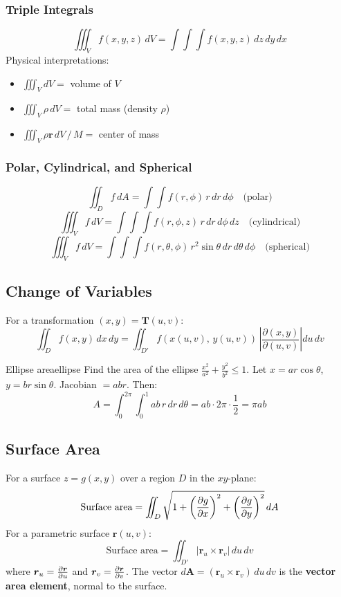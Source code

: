 \documentclass[11pt, letterpaper]{article}
\theoremstyle{plain}
\newcommand{\vv}[1]{\bm{#1}}
\begin{document}
\subsubsection*{Triple Integrals}
\[
    \iiint_V f(x,y,z)\,dV = \int\int\int f(x,y,z)\,dz\,dy\,dx
\]
Physical interpretations:
\begin{itemize}
    \item $\iiint_V dV = $ volume of $V$
    \item $\iiint_V \rho\,dV = $ total mass (density $\rho$)
    \item $\iiint_V \rho\vv{r}\,dV\,/\,M = $ center of mass
\end{itemize}

\subsubsection*{Polar, Cylindrical, and Spherical}
\[
    \iint_D f\,dA = \int\int f(r,\phi)\,r\,dr\,d\phi \quad \text{(polar)}
\]
\[
    \iiint_V f\,dV = \int\int\int f(r,\phi,z)\,r\,dr\,d\phi\,dz
    \quad \text{(cylindrical)}
\]
\[
    \iiint_V f\,dV = \int\int\int f(r,\theta,\phi)\,
    r^2\sin\theta\,dr\,d\theta\,d\phi \quad \text{(spherical)}
\]


\subsection{Change of Variables}

For a transformation $(x,y) = \vv{T}(u,v)$:
\[
    \iint_D f(x,y)\,dx\,dy
    = \iint_{D'} f(x(u,v),\,y(u,v))\,\left|\frac{\partial(x,y)}{\partial(u,v)}\right|du\,dv
\]

\begin{example}{Ellipse area}{ellipse}
    Find the area of the ellipse $\frac{x^2}{a^2} + \frac{y^2}{b^2} \leq 1$.
    Let $x = ar\cos\theta$, $y = br\sin\theta$. Jacobian $= abr$. Then:
    \[
        A = \int_0^{2\pi}\int_0^1 ab\,r\,dr\,d\theta
        = ab\cdot 2\pi \cdot \frac{1}{2} = \pi ab
    \]
\end{example}


\subsection{Surface Area}

For a surface $z = g(x,y)$ over a region $D$ in the $xy$-plane:
\[
    \text{Surface area} = \iint_D \sqrt{1 + \left(\pdv{g}{x}\right)^2
    + \left(\pdv{g}{y}\right)^2}\,dA
\]
For a parametric surface $\vv{r}(u,v)$:
\[
    \text{Surface area} = \iint_{D'} |\vv{r}_u \times \vv{r}_v|\,du\,dv
\]
where $\vv{r}_u = \pdv{\vv{r}}{u}$ and $\vv{r}_v = \pdv{\vv{r}}{v}$.
The vector $d\vv{A} = (\vv{r}_u\times\vv{r}_v)\,du\,dv$ is the
\textbf{vector area element}, normal to the surface.
\end{document}

